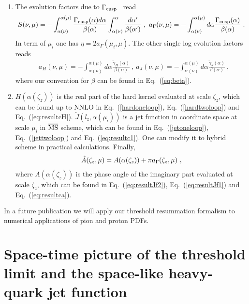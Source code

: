 \documentclass[a4paper,11pt]{article}
\begin{document}
\begin{enumerate}
     \item The evolution factors due to $\Gamma_{\rm cusp}$~\cite{Becher:2006mr} read
\begin{align}\label{eq:aGamma}
S(\nu,\mu)=-\int_{\alpha(\nu)}^{\alpha(\mu)}\frac{\Gamma_{\rm cusp}(\alpha)d\alpha}{\beta(\alpha)}\int_{\alpha(\nu)}^{\alpha}\frac{d\alpha'}{\beta(\alpha')} \ , \ a_{\rm \Gamma}(\nu,\mu)=-\int_{\alpha(\nu)}^{\alpha(\mu)} d\alpha\frac{\Gamma_{\rm cusp}(\alpha)}{\beta(\alpha)} \ .
\end{align}
In term of $\mu_i$ one has $\eta=2a_{\Gamma}(\mu_i,\mu)$.
The other single log evolution factors~\cite{Becher:2006mr} reads
\begin{align}\label{eq:othera}
&a_{H}(\nu,\mu)=-\int_{\alpha(\nu)}^{\alpha(\mu)} d\alpha\frac{\tilde \gamma_H(\alpha)}{\beta(\alpha)} \ ,  \ 
a_{J}(\nu,\mu)=-\int_{\alpha(\nu)}^{\alpha(\mu)} d\alpha\frac{\tilde \gamma_{J}(\alpha)}{\beta(\alpha)} \ ,
\end{align}    
where our convention for $\beta$ can be found in Eq.~(\ref{eq:beta}).
\item $H(\alpha(\zeta_z))$ is the real part of the hard kernel evaluated at scale $\zeta_z$, which can be found up to NNLO in Eq.~(\ref{hardoneloop}), Eq.~(\ref{hardtwoloop}) and Eq.~(\ref{eq:resultcH}). $\tilde J(l_z,\alpha(\mu_i))$ is a jet function in coordinate space at scale $\mu_i$ in $\overline{\rm MS}$ scheme, which can be found in Eq.~(\ref{jetoneloop}), Eq.~(\ref{jettwoloop}) and Eq.~(\ref{eq:resultc1}). One can modify it to hybrid scheme in practical calculations. Finally, 
\begin{align}
\hat A(\zeta_z,\mu)=A(\alpha(\zeta_z))+\pi a_{\rm \Gamma}(\zeta_z,\mu) \ ,
\end{align} 
where $A(\alpha(\zeta_z))$ is the phase angle of the imaginary part evaluated at scale $\zeta_z$, which can be found in Eq.~(\ref{eq:resultJf2}), Eq.~(\ref{eq:resultJf1}) and Eq.~(\ref{eq:resultca}).
\end{enumerate}
In a future publication we will apply our threshold resummation formalism to numerical applications of pion and proton PDFs.

\section{Space-time picture of the threshold limit and the space-like heavy-quark jet function}\label{sec:space-like jet}
\end{document}
